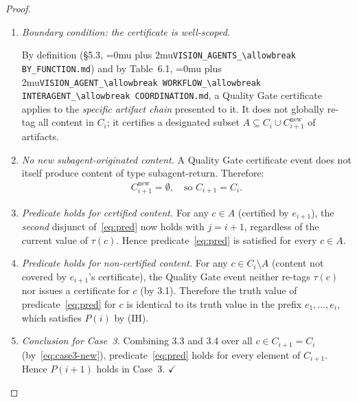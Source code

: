 \documentclass[12pt]{article}
\theoremstyle{definition}
\DeclareRobustCommand{\code}[1]{\begingroup\Urlmuskip=0mu plus 2mu\relax\nolinkurl{#1}\endgroup}
\newcommand{\VisionFunc}{\code{VISION\_AGENTS\_\allowbreak BY\_FUNCTION.md}}
\newcommand{\VisionFlow}{\code{VISION\_AGENT\_\allowbreak WORKFLOW\_\allowbreak INTERAGENT\_\allowbreak COORDINATION.md}}
\begin{document}
\begin{proof}
\begin{enumerate}
    \begin{enumerate}
        \item[3.1] \emph{Boundary condition: the certificate is
                   well-scoped.}
                   \begin{sloppypar}
                   By definition (\S5.3,
                   \VisionFunc{}) and by
                   Table~6.1, \VisionFlow{}, a Quality Gate certificate
                   applies to the \emph{specific artifact chain} presented
                   to it.  It does not globally re-tag all content in
                   $C_i$; it certifies a designated subset
                   $A \subseteq C_i \cup C^{\mathrm{new}}_{i+1}$ of
                   artifacts.
                   \end{sloppypar}
        \item[3.2] \emph{No new subagent-originated content.}
                   A Quality Gate certificate event does not itself produce
                   content of type subagent-return.  Therefore:
                   \begin{align}
                       \label{eq:case3-new}
                       C^{\mathrm{new}}_{i+1} = \emptyset,
                       \quad \text{so } C_{i+1} = C_i.
                   \end{align}
        \item[3.3] \emph{Predicate holds for certified content.}
                   For any $c \in A$ (certified by $e_{i+1}$), the
                   \emph{second} disjunct of~\eqref{eq:pred} now holds
                   with $j = i+1$, regardless of the current value of
                   $\tau(c)$.  Hence predicate~\eqref{eq:pred} is
                   satisfied for every $c \in A$.
        \item[3.4] \emph{Predicate holds for non-certified content.}
                   For any $c \in C_i \setminus A$ (content not covered
                   by $e_{i+1}$'s certificate), the Quality Gate event
                   neither re-tags $\tau(c)$ nor issues a certificate
                   for $c$ (by 3.1).  Therefore the truth value of
                   predicate~\eqref{eq:pred} for $c$ is identical to its
                   truth value in the prefix $e_1,\ldots,e_i$, which
                   satisfies $P(i)$ by (IH).
        \item[3.5] \emph{Conclusion for Case~3.}
                   Combining 3.3 and 3.4 over all $c \in C_{i+1} = C_i$
                   (by~\eqref{eq:case3-new}), predicate~\eqref{eq:pred}
                   holds for every element of $C_{i+1}$.  Hence $P(i+1)$
                   holds in Case~3. \hfill$\checkmark$
    \end{enumerate}
\end{enumerate}


\end{proof}
\end{document}
